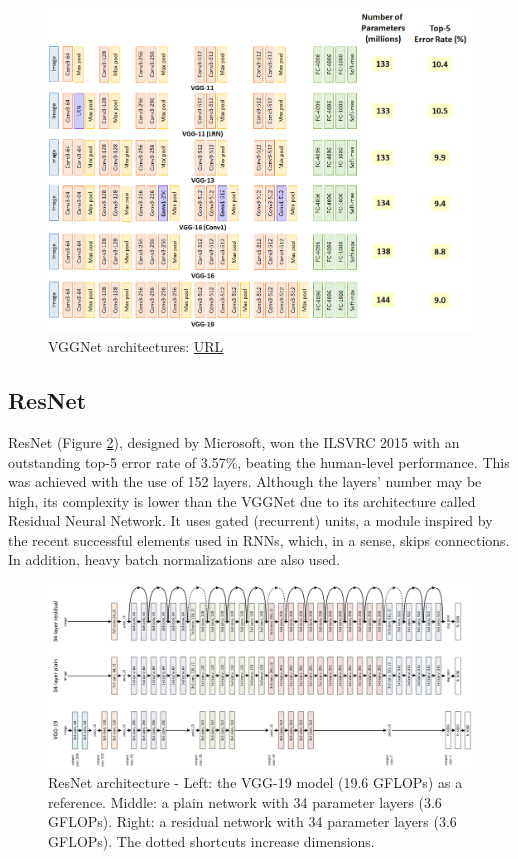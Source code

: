 \begin{figure} [H]
	\centering
	\includegraphics[width=\textwidth]{Images/CNNArchitectures/VGGNet.png}
	\decoRule
	\caption[VGGNet architectures]{VGGNet architectures: \href{https://medium.com/coinmonks/paper-review-of-vggnet-1st-runner-up-of-ilsvlc-2014-image-classification-d02355543a11}{URL}}
	\label{fig:VGGNet}
\end{figure}

\subsection{ResNet}
ResNet \cite{Deep-Residual-Learning-for-Image-Recognition} (Figure \ref{fig:ResNet}), designed by Microsoft, won the ILSVRC 2015 with an outstanding top-5 error rate of 3.57\%, beating the human-level performance. This was achieved with the use of 152 layers. Although the layers' number may be high, its complexity is lower than the VGGNet due to its architecture called Residual Neural Network. It uses gated (recurrent) units, a module inspired by the recent successful elements used in RNNs, which, in a sense, skips connections. In addition, heavy batch normalizations are also used.

\begin{figure} [H]
	\centering
	\includegraphics[width=\textwidth]{Images/CNNArchitectures/ResNet.png}
	\decoRule
	\caption[ResNet architecture]{ResNet architecture - Left: the VGG-19 model (19.6 GFLOPs) as a reference. Middle: a plain network with 34 parameter layers (3.6 GFLOPs). Right: a residual network with 34 parameter layers (3.6 GFLOPs). The dotted shortcuts increase dimensions.}
	\label{fig:ResNet}
\end{figure}

